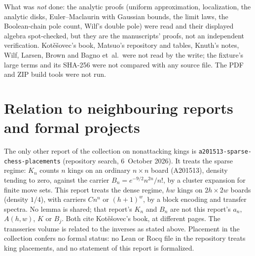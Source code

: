 \documentclass[11pt,letterpaper]{article}
\numberwithin{equation}{section}
\theoremstyle{remark}\newtheorem{remark}[theorem]{Remark}
\newcommand{\file}[1]{\nolinkurl{#1}}
\begin{document}
What was \emph{not} done: the analytic proofs (uniform approximation, localization, the analytic disks, Euler--Maclaurin with Gaussian bounds, the limit laws, the Boolean-chain pole count, Wilf's double pole) were read and their displayed algebra spot-checked, but they are the manuscripts' proofs, not an independent verification. Kot\v e\v sovec's book, Matsuo's repository and tables, Knuth's notes, Wilf, Larsen, Brown and Bagno et~al.\ were not read by the write; the fixture's large terms and its SHA-256 were not compared with any source file. The PDF and ZIP build tools were not run.

\section*{Relation to neighbouring reports and formal projects}\label{mdk:sec:neighbours}
The only other report of the collection on nonattacking kings is \file{a201513-sparse-chess-placements} (repository search, 6~October 2026). It treats the sparse regime: $K_n$ counts $n$ kings on an ordinary $n\times n$ board (A201513), density tending to zero, against the carrier $B_n=e^{-9/2}n^{2n}/n!$, by a cluster expansion for finite move sets. This report treats the dense regime, $hw$ kings on $2h\times2w$ boards (density $1/4$), with carriers $Cn^n$ or $(h+1)^w$, by a block encoding and transfer spectra. No lemma is shared; that report's $K_n$ and $B_n$ are not this report's $a_n$, $A(h,w)$, $K$ or $B_j$. Both cite Kot\v e\v sovec's book, at different pages. The transseries volume \cite{TSvol} is related to the inverses as stated above. Placement in the collection confers no formal status: no Lean or Rocq file in the repository treats king placements, and no statement of this report is formalized.
\clearpage
\end{document}
